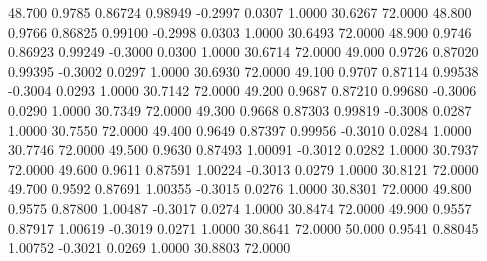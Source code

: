   48.700   0.9785   0.86724   0.98949  -0.2997   0.0307   1.0000  30.6267  72.0000
  48.800   0.9766   0.86825   0.99100  -0.2998   0.0303   1.0000  30.6493  72.0000
  48.900   0.9746   0.86923   0.99249  -0.3000   0.0300   1.0000  30.6714  72.0000
  49.000   0.9726   0.87020   0.99395  -0.3002   0.0297   1.0000  30.6930  72.0000
  49.100   0.9707   0.87114   0.99538  -0.3004   0.0293   1.0000  30.7142  72.0000
  49.200   0.9687   0.87210   0.99680  -0.3006   0.0290   1.0000  30.7349  72.0000
  49.300   0.9668   0.87303   0.99819  -0.3008   0.0287   1.0000  30.7550  72.0000
  49.400   0.9649   0.87397   0.99956  -0.3010   0.0284   1.0000  30.7746  72.0000
  49.500   0.9630   0.87493   1.00091  -0.3012   0.0282   1.0000  30.7937  72.0000
  49.600   0.9611   0.87591   1.00224  -0.3013   0.0279   1.0000  30.8121  72.0000
  49.700   0.9592   0.87691   1.00355  -0.3015   0.0276   1.0000  30.8301  72.0000
  49.800   0.9575   0.87800   1.00487  -0.3017   0.0274   1.0000  30.8474  72.0000
  49.900   0.9557   0.87917   1.00619  -0.3019   0.0271   1.0000  30.8641  72.0000
  50.000   0.9541   0.88045   1.00752  -0.3021   0.0269   1.0000  30.8803  72.0000
